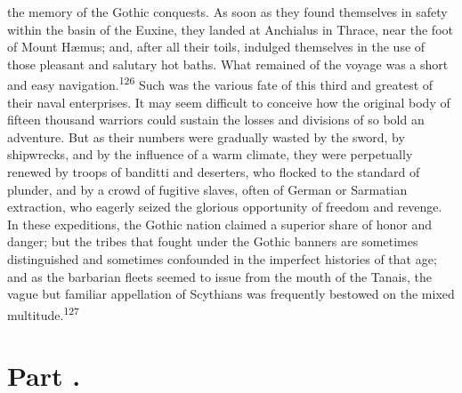 the memory of the Gothic conquests. As soon as they found
themselves in safety within the basin of the Euxine, they landed
at Anchialus in Thrace, near the foot of Mount Hæmus; and, after
all their toils, indulged themselves in the use of those pleasant
and salutary hot baths. What remained of the voyage was a short
and easy navigation.\textsuperscript{126} Such was the various fate of this third
and greatest of their naval enterprises. It may seem difficult to
conceive how the original body of fifteen thousand warriors could
sustain the losses and divisions of so bold an adventure. But as
their numbers were gradually wasted by the sword, by shipwrecks,
and by the influence of a warm climate, they were perpetually
renewed by troops of banditti and deserters, who flocked to the
standard of plunder, and by a crowd of fugitive slaves, often of
German or Sarmatian extraction, who eagerly seized the glorious
opportunity of freedom and revenge. In these expeditions, the
Gothic nation claimed a superior share of honor and danger; but
the tribes that fought under the Gothic banners are sometimes
distinguished and sometimes confounded in the imperfect histories
of that age; and as the barbarian fleets seemed to issue from the
mouth of the Tanais, the vague but familiar appellation of
Scythians was frequently bestowed on the mixed multitude.\textsuperscript{127}





\section{Part \thesection.}

